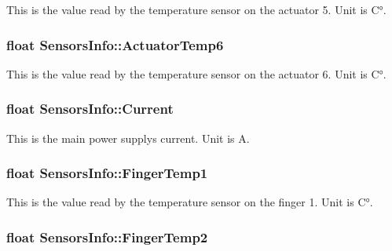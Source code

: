 This is the value read by the temperature sensor on the actuator 5. Unit is C°. 

\subsubsection[{\texorpdfstring{Actuator\+Temp6}{ActuatorTemp6}}]{\setlength{\rightskip}{0pt plus 5cm}float Sensors\+Info\+::\+Actuator\+Temp6}\hypertarget{structSensorsInfo_aa22bb78967dc3b480280c422613f8382}{}\label{structSensorsInfo_aa22bb78967dc3b480280c422613f8382}


This is the value read by the temperature sensor on the actuator 6. Unit is C°. 

\subsubsection[{\texorpdfstring{Current}{Current}}]{\setlength{\rightskip}{0pt plus 5cm}float Sensors\+Info\+::\+Current}\hypertarget{structSensorsInfo_a2be7e431dce5a2093e6f61a7333b574c}{}\label{structSensorsInfo_a2be7e431dce5a2093e6f61a7333b574c}


This is the main power supply\textquotesingle{}s current. Unit is A. 

\subsubsection[{\texorpdfstring{Finger\+Temp1}{FingerTemp1}}]{\setlength{\rightskip}{0pt plus 5cm}float Sensors\+Info\+::\+Finger\+Temp1}\hypertarget{structSensorsInfo_a752833e7fba2c791ecf2693b96cff3d0}{}\label{structSensorsInfo_a752833e7fba2c791ecf2693b96cff3d0}


This is the value read by the temperature sensor on the finger 1. Unit is C°. 

\subsubsection[{\texorpdfstring{Finger\+Temp2}{FingerTemp2}}]{\setlength{\rightskip}{0pt plus 5cm}float Sensors\+Info\+::\+Finger\+Temp2}\hypertarget{structSensorsInfo_a97f570d85f99948f785551712da25145}{}\label{structSensorsInfo_a97f570d85f99948f785551712da25145}


